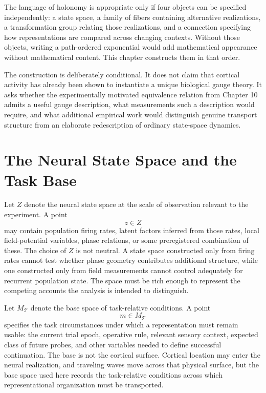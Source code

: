 \documentclass[11pt]{book}
\begin{document}
The language of holonomy is appropriate only if four objects can be specified independently: a state space, a family of fibers containing alternative realizations, a transformation group relating those realizations, and a connection specifying how representations are compared across changing contexts. Without those objects, writing a path-ordered exponential would add mathematical appearance without mathematical content. This chapter constructs them in that order.

The construction is deliberately conditional. It does not claim that cortical activity has already been shown to instantiate a unique biological gauge theory. It asks whether the experimentally motivated equivalence relation from Chapter 10 admits a useful gauge description, what measurements such a description would require, and what additional empirical work would distinguish genuine transport structure from an elaborate redescription of ordinary state-space dynamics.

\section*{The Neural State Space and the Task Base}

Let $Z$ denote the neural state space at the scale of observation relevant to the experiment. A point
\[
z\in Z
\]
may contain population firing rates, latent factors inferred from those rates, local field-potential variables, phase relations, or some preregistered combination of these. The choice of $Z$ is not neutral. A state space constructed only from firing rates cannot test whether phase geometry contributes additional structure, while one constructed only from field measurements cannot control adequately for recurrent population state. The space must be rich enough to represent the competing accounts the analysis is intended to distinguish.

Let $M_{\mathcal T}$ denote the base space of task-relative conditions. A point
\[
m\in M_{\mathcal T}
\]
specifies the task circumstances under which a representation must remain usable: the current trial epoch, operative rule, relevant sensory context, expected class of future probes, and other variables needed to define successful continuation. The base is not the cortical surface. Cortical location may enter the neural realization, and traveling waves move across that physical surface, but the base space used here records the task-relative conditions across which representational organization must be transported.
\end{document}
